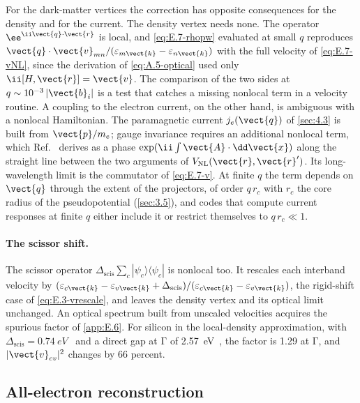 For the dark-matter vertices the correction has opposite consequences for the density and for the current. The density vertex needs none. The operator $\ee^{\ii\vect{q}\cdot\vect{r}}$ is local, and \cref{eq:E.7-rhopw} evaluated at small $q$ reproduces $\vect{q}\cdot\vect{v}_{mn}/(\varepsilon_{m\vect{k}} - \varepsilon_{n\vect{k}})$ with the full velocity of \cref{eq:E.7-vNL}, since the derivation of \cref{eq:A.5-optical} used only $\ii[H,\vect{r}] = \vect{v}$. The comparison of the two sides at $q \sim 10^{-3}\,|\vect{b}_i|$ is a test that catches a missing nonlocal term in a velocity routine. A coupling to the electron current, on the other hand, is ambiguous with a nonlocal Hamiltonian. The paramagnetic current $j_e(\vect{q})$ of \cref{sec:4.3} is built from $\vect{p}/m_e$; gauge invariance requires an additional nonlocal term, which Ref.~\cite[Eqs.~(18) and~(19)]{ismailbeigi2001coupling} derives as a phase $\exp(\ii\int\vect{A}\cdot\dd\vect{x})$ along the straight line between the two arguments of $V_{\mathrm{NL}}(\vect{r},\vect{r}')$. Its long-wavelength limit is the commutator of \cref{eq:E.7-v}. At finite $q$ the term depends on $\vect{q}$ through the extent of the projectors, of order $q\,r_c$ with $r_c$ the core radius of the pseudopotential (\cref{sec:3.5}), and codes that compute current responses at finite $q$ either include it or restrict themselves to $q\,r_c \ll 1$.

\paragraph{The scissor shift.} The scissor operator $\Delta_{\mathrm{scis}}\sum_c|\psi_c\rangle\langle\psi_c|$ is nonlocal too. It rescales each interband velocity by $(\varepsilon_{c\vect{k}} - \varepsilon_{v\vect{k}} + \Delta_{\mathrm{scis}})/(\varepsilon_{c\vect{k}} - \varepsilon_{v\vect{k}})$, the rigid-shift case of \cref{eq:E.3-vrescale}, and leaves the density vertex and its optical limit unchanged. An optical spectrum built from unscaled velocities acquires the spurious factor of \cref{app:E.6}. For silicon in the local-density approximation, with $\Delta_{\mathrm{scis}} = \SI{0.74}{eV}$~\cite[Sect.~VII]{zacharias2016one} and a direct gap at $\mathrm{\Gamma}$ of \SI{2.57}{eV}~\cite[Table~V]{ponce2015temperature}, the factor is 1.29 at $\mathrm{\Gamma}$, and $|\vect{v}_{cv}|^2$ changes by 66 percent.

\subsection{All-electron reconstruction}

